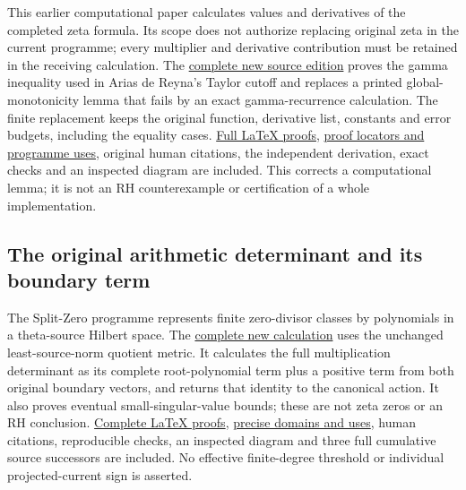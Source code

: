 \documentclass[
]{article}
\begin{document}
This earlier computational paper calculates values and derivatives of
the completed zeta formula. Its scope does not authorize replacing
original zeta in the current programme; every multiplier and derivative
contribution must be retained in the receiving calculation. The
\href{https://github.com/KokunoYumeto/zeta-function-research-reader/blob/main/workbenches/splitzero-tandem/continuations/20260920-gamma-and-finite-derivative/README.md}{complete
new source edition} proves the gamma inequality used in Arias de Reyna's
Taylor cutoff and replaces a printed global-monotonicity lemma that
fails by an exact gamma-recurrence calculation. The finite replacement
keeps the original function, derivative list, constants and error
budgets, including the equality cases.
\href{https://github.com/KokunoYumeto/zeta-function-research-reader/blob/main/workbenches/splitzero-tandem/continuations/20260920-gamma-and-finite-derivative/COMPLETE_PROOFS.tex}{Full
LaTeX proofs},
\href{https://github.com/KokunoYumeto/zeta-function-research-reader/blob/main/workbenches/splitzero-tandem/continuations/20260920-gamma-and-finite-derivative/RESULT_INDEX.json}{proof
locators and programme uses}, original human citations, the independent
derivation, exact checks and an inspected diagram are included. This
corrects a computational lemma; it is not an RH counterexample or
certification of a whole implementation.

\subsection{The original arithmetic determinant and its boundary
term}\label{the-original-arithmetic-determinant-and-its-boundary-term}

The Split-Zero programme represents finite zero-divisor classes by
polynomials in a theta-source Hilbert space. The
\href{https://github.com/KokunoYumeto/zeta-function-research-reader/blob/main/workbenches/splitzero-tandem/continuations/20260920-original-spectral-determinant/README.md}{complete
new calculation} uses the unchanged least-source-norm quotient metric.
It calculates the full multiplication determinant as its complete
root-polynomial term plus a positive term from both original boundary
vectors, and returns that identity to the canonical action. It also
proves eventual small-singular-value bounds; these are not zeta zeros or
an RH conclusion.
\href{https://github.com/KokunoYumeto/zeta-function-research-reader/blob/main/workbenches/splitzero-tandem/continuations/20260920-original-spectral-determinant/COMPLETE_PROOFS.tex}{Complete
LaTeX proofs},
\href{https://github.com/KokunoYumeto/zeta-function-research-reader/blob/main/workbenches/splitzero-tandem/continuations/20260920-original-spectral-determinant/RESULT_INDEX.json}{precise
domains and uses}, human citations, reproducible checks, an inspected
diagram and three full cumulative source successors are included. No
effective finite-degree threshold or individual projected-current sign
is asserted.
\end{document}
